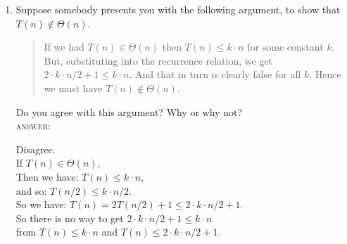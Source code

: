 \documentclass[11pt]{article}
\begin{document}
\begin{enumerate}
\begin{enumerate}
\item
Suppose somebody presents you with the following argument, to show
that $T(n) \not\in \Theta(n)$.
\begin{quote}
If we had $T(n) \in \Theta(n)$ then $T(n) \leq k \cdot n$ for some constant $k$.
But, substituting into the recurrence relation, we get
$2 \cdot k \cdot n/2 + 1 \leq k \cdot n$.
And that in turn is clearly false for all $k$.
Hence we must have $T(n) \not\in \Theta(n)$.
\end{quote}
Do you agree with this argument?
Why or why not?
\\
\textsc{answer}:
\par
Disagree.
\\If $T(n)\in\Theta(n)$,
\\Then we have: $T(n) \leq k \cdot n$,
\\and so: $T(n/2) \leq k \cdot n/2$.
\\So we have: $T(n)=2T(n/2)+1 \leq 2 \cdot k \cdot n/2 + 1$.
\\So there is no way to get $2 \cdot k \cdot n/2 + 1 \leq k \cdot n$
\\from $T(n) \leq k \cdot n$ and $T(n)\leq 2 \cdot k \cdot n/2 + 1$.
\end{enumerate}


\end{enumerate}
\end{document}
